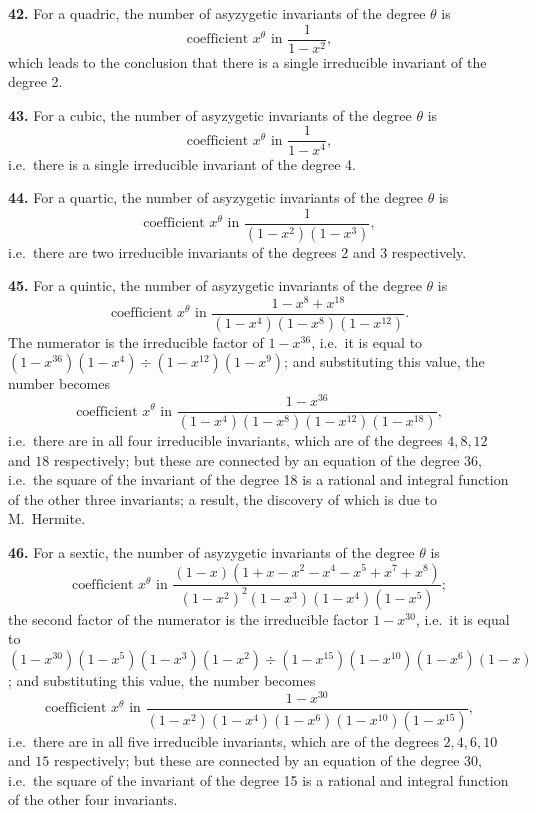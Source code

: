 \documentclass[11pt]{article}
\begin{document}
\textbf{42.} For a quadric, the number of asyzygetic invariants of the degree $\theta$ is
\[
\text{coefficient } x^\theta \text{ in } \frac{1}{1 - x^2},
\]
which leads to the conclusion that there is a single irreducible invariant of the degree 2.

\textbf{43.} For a cubic, the number of asyzygetic invariants of the degree $\theta$ is
\[
\text{coefficient } x^\theta \text{ in } \frac{1}{1 - x^4},
\]
i.e.\ there is a single irreducible invariant of the degree 4.

\textbf{44.} For a quartic, the number of asyzygetic invariants of the degree $\theta$ is
\[
\text{coefficient } x^\theta \text{ in } \frac{1}{(1 - x^2)(1 - x^3)},
\]
i.e.\ there are two irreducible invariants of the degrees 2 and 3 respectively.

\textbf{45.} For a quintic, the number of asyzygetic invariants of the degree $\theta$ is
\[
\text{coefficient } x^\theta \text{ in } \frac{1 - x^8 + x^{18}}{(1 - x^4)(1 - x^8)(1 - x^{12})}.
\]
The numerator is the irreducible factor of $1 - x^{36}$, i.e.\ it is equal to $(1 - x^{36})(1 - x^4) \div (1 - x^{12})(1 - x^9)$; and substituting this value, the number becomes
\[
\text{coefficient } x^\theta \text{ in } \frac{1 - x^{36}}{(1 - x^4)(1 - x^8)(1 - x^{12})(1 - x^{18})},
\]
i.e.\ there are in all four irreducible invariants, which are of the degrees $4, 8, 12$ and $18$ respectively; but these are connected by an equation of the degree 36, i.e.\ the square of the invariant of the degree 18 is a rational and integral function of the other three invariants; a result, the discovery of which is due to M.\ Hermite.

\textbf{46.} For a sextic, the number of asyzygetic invariants of the degree $\theta$ is
\[
\text{coefficient } x^\theta \text{ in } \frac{(1 - x)(1 + x - x^2 - x^4 - x^5 + x^7 + x^8)}{(1 - x^2)^2(1 - x^3)(1 - x^4)(1 - x^5)};
\]
the second factor of the numerator is the irreducible factor $1 - x^{30}$, i.e.\ it is equal to $(1 - x^{30})(1 - x^5)(1 - x^3)(1 - x^2) \div (1 - x^{15})(1 - x^{10})(1 - x^6)(1 - x)$; and substituting this value, the number becomes
\[
\text{coefficient } x^\theta \text{ in } \frac{1 - x^{30}}{(1 - x^2)(1 - x^4)(1 - x^6)(1 - x^{10})(1 - x^{15})},
\]
i.e.\ there are in all five irreducible invariants, which are of the degrees $2, 4, 6, 10$ and $15$ respectively; but these are connected by an equation of the degree 30, i.e.\ the square of the invariant of the degree 15 is a rational and integral function of the other four invariants.
\end{document}
